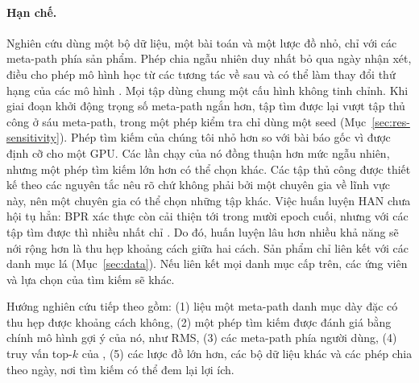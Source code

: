 \paragraph{Hạn chế.} Nghiên cứu dùng một bộ dữ liệu, một bài toán và một lược đồ nhỏ, chỉ với các
meta-path phía sản phẩm. Phép chia ngẫu nhiên duy nhất bỏ qua ngày nhận xét, điều cho phép mô
hình học từ các tương tác về sau và có thể làm thay đổi thứ hạng của các mô hình
\citep{ji2023leakage,meng2020splitting}. Mọi tập dùng chung một cấu hình không tinh chỉnh. Khi giai
đoạn khởi động trọng số meta-path ngắn hơn, tập tìm được lại vượt tập thủ công ở sáu meta-path,
trong một phép kiểm tra chỉ dùng một seed (Mục~\ref{sec:res-sensitivity}). Phép tìm kiếm của chúng
tôi nhỏ hơn so với bài báo gốc vì được định cỡ cho một GPU. Các lần chạy của nó đồng thuận hơn mức
ngẫu nhiên, nhưng một phép tìm kiếm lớn hơn có thể chọn khác. Các tập thủ công được thiết kế theo các nguyên
tắc nêu rõ chứ không phải bởi một chuyên gia về lĩnh vực này, nên một chuyên gia có thể chọn những
tập khác. Việc huấn luyện HAN chưa hội tụ hẳn: BPR xác thực còn cải thiện tới 
trong mười epoch cuối, nhưng với các tập tìm được thì nhiều nhất chỉ . Do
đó, huấn luyện lâu hơn nhiều khả năng sẽ nới rộng hơn là thu hẹp khoảng cách giữa hai cách. Sản
phẩm chỉ liên kết với các danh mục lá (Mục~\ref{sec:data}). Nếu liên kết mọi danh mục cấp trên, các
ứng viên và lựa chọn của tìm kiếm sẽ khác.

Hướng nghiên cứu tiếp theo gồm: (1) liệu một meta-path danh mục dày đặc có thu hẹp
được khoảng cách không, (2) một phép tìm kiếm được đánh giá bằng chính mô hình gợi ý của nó, như
RMS, (3) các meta-path phía người dùng, (4) truy vấn top-$k$ của \citet{zhu2020topk}, (5) các lược
đồ lớn hơn, các bộ dữ liệu khác và các phép chia theo ngày, nơi tìm kiếm có thể đem lại lợi ích.
